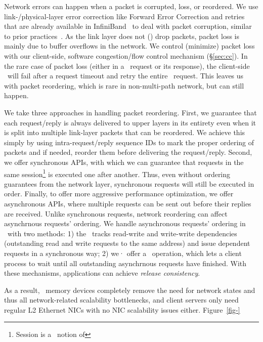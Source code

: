 Network errors can happen when a packet is corrupted, loss, or reordered.
We use link-/physical-layer error correction like Forward Error Correction and retries that are already available in InfiniBand~\cite{MellanoxOFED} 
to deal with packet corruption, similar to prior practices~\cite{RAIL-NSDI17,FaSST}.
As the link layer does not () drop packets, packet loss is mainly due to buffer overflows in the network.
We control (minimize) packet loss with our client-side, software congestion/flow control mechanism (\S\ref{sec:cc}).
In the rare case of packet loss (either in a \sys\ request or its response), the client-side \syslib\ will fail after a request timeout
and retry the entire \sys\ request.
This leaves us with packet reordering, which is rare in non-multi-path network, but can still happen.

We take three approaches in handling packet reordering.
First, we guarantee that each request/reply is always delivered to upper layers in its entirety 
even when it is split into multiple link-layer packets that can be reordered.
We achieve this simply by using intra-request/reply sequence IDs to mark the proper ordering of packets 
and if needed, reorder them before delivering the request/reply.
Second, we offer synchronous APIs, with which we can guarantee that requests in the same session\footnote{Session is a \sys\ notion of }
is executed one after another. 
Thus, even without ordering guarantees from the network layer, synchronous requests will still be executed in order.
Finally, to offer more aggressive performance optimization, we offer asynchronous APIs, 
where multiple requests can be sent out before their replies are received.
Unlike synchronous requests, network reordering can affect asynchrnous requests' ordering.
We handle asynchronous requests' ordering in \sys\ with two methods:
1) the \syslib\ tracks read-write and write-write dependencies (outstanding read and write requests to the same address)
and issue dependent requests in a synchronous way;
2) we· offer a \fence\ operation, which lets a client process to wait until all outstanding asynchrnous requests have finished.
With these mechanisms, applications can achieve {\em release consistency}.

As a result, \sys\ memory devices completely remove the need for network states and thus all network-related scalability bottlenecks,
and client servers only need regular L2 Ethernet NICs with no NIC scalability issues either.
Figure~\ref{fig-} 

